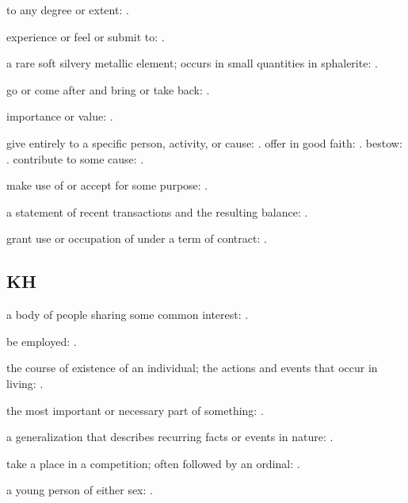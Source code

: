   to any degree or extent: .

  experience or feel or submit to: .

  a rare soft silvery metallic element; occurs in small quantities in sphalerite:   .

  go or come after and bring or take back:   .

  importance or value: .

  give entirely to a specific person, activity, or cause:   . offer in good faith: . bestow:   . contribute to some cause:   .

  make use of or accept for some purpose:   .

  a statement of recent transactions and the resulting balance:   .

  grant use or occupation of under a term of contract:   .

\subsection*{KH}

  a body of people sharing some common interest: .

  be employed:   .

  the course of existence of an individual; the actions and events that occur in living: .

  the most important or necessary part of something:   .

  a generalization that describes recurring facts or events in nature:   .

  take a place in a competition; often followed by an ordinal:   .

  a young person of either sex:   .

